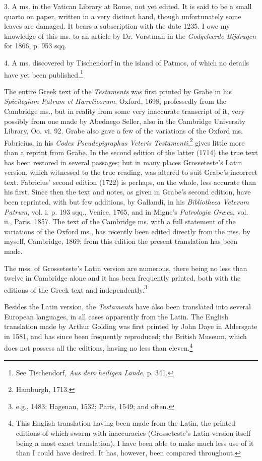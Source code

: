 3. A ms. in the Vatican Library at Rome, not yet edited. It is said to be a small quarto on paper, written in a very distinct hand, though unfortunately some leaves are damaged. It bears a subscription with the date 1235. I owe my knowledge of this ms. to an article by Dr. Vorstman in the \emph{Godgeleerde Bijdragen} for 1866, p. 953 sqq.

4. A ms. discovered by Tischendorf in the island of Patmos, of which no details have yet been published.\footnote{See Tischendorf, \emph{Aus dem heiligen Lande}, p. 341.}

The entire Greek text of the \emph{Testaments} was first printed by Grabe in his \emph{Spicilegium Patrum et Hæreticorum}, Oxford, 1698, professedly from the Cambridge ms., but in reality from some very inaccurate transcript of it, very possibly from one made by Abednego Seller, also in the Cambridge University Library, Oo. vi. 92. Grabe also gave a few of the variations of the Oxford ms. Fabricius, in his \emph{Codex Pseudepigraphus Veteris Testamenti},\footnote{Hamburgh, 1713.} gives little more than a reprint from Grabe. In the second edition of the latter (1714) the true text has been restored in several passages; but in many places Grosseteste’s Latin version, which witnessed to the true reading, was altered to suit Grabe’s incorrect text. Fabricius’ second edition (1722) is perhaps, on the whole, less accurate than his first. Since then the text and notes, as given in Grabe’s second edition, have been reprinted, with but few additions, by Gallandi, in his \emph{Bibliotheca Veterum Patrum}, vol. i. p. 193 sqq., Venice, 1765, and in Migne’s \emph{Patrologia Græca}, vol. ii., Paris, 1857. The text of the Cambridge ms. with a full statement of the variations of the Oxford ms., has recently been edited directly from the mss. by myself, Cambridge, 1869; from this edition the present translation has been made.

The mss. of Grosseteste’s Latin version are numerous, there being no less than twelve in Cambridge alone and it has been frequently printed, both with the editions of the Greek text and independently.\footnote{e.g., 1483; Hagenau, 1532; Paris, 1549; and often.}

Besides the Latin version, the \emph{Testaments} have also been translated into several European languages, in all cases apparently from the Latin. The English translation made by Arthur Golding was first printed by John Daye in Aldersgate in 1581, and has since been frequently reproduced; the British Museum, which does not possess all the editions, having no less than eleven.\footnote{This English translation having been made from the Latin, the printed editions of which swarm with inaccuracies (Grosseteste’s Latin version itself being a most exact translation), I have been able to make much less use of it than I could have desired. It has, however, been compared throughout.}

